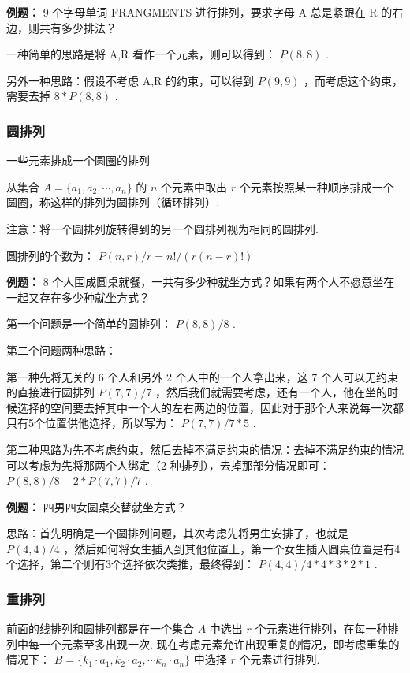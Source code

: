 \documentclass[cn, hazy, blue, normal, 12pt]{elegantnote}
\begin{document}
\textbf{例题：} 9 个字母单词 FRANGMENTS 进行排列，要求字母 A 总是紧跟在 R 的右边，则共有多少排法？

一种简单的思路是将 A,R 看作一个元素，则可以得到： $ P(8,8) $ .

另外一种思路：假设不考虑 A,R 的约束，可以得到 $ P(9,9) $ ，而考虑这个约束， 需要去掉 $ 8*P(8,8) $ .

\subsubsection{圆排列}

一些元素排成一个圆圈的排列

从集合 $ A=\{a_1,a_2,\cdots,a_n\} $ 的 $ n $ 个元素中取出 $ r $ 个元素按照某一种顺序排成一个圆圈，称这样的排列为圆排列（循环排列）.

注意：将一个圆排列旋转得到的另一个圆排列视为相同的圆排列.

圆排列的个数为： $ P(n,r)/r=n!/(r(n-r)!) $

\textbf{例题：} 8 个人围成圆桌就餐，一共有多少种就坐方式？如果有两个人不愿意坐在一起又存在多少种就坐方式？

第一个问题是一个简单的圆排列： $ P(8,8)/8 $ .

第二个问题两种思路：

第一种先将无关的 6 个人和另外 2 个人中的一个人拿出来，这 7 个人可以无约束的直接进行圆排列 $ P(7,7)/7 $ ，然后我们就需要考虑，还有一个人，他在坐的时候选择的空间要去掉其中一个人的左右两边的位置，因此对于那个人来说每一次都只有5个位置供他选择，所以写为： $ P(7,7)/7 *5 $ .

第二种思路为先不考虑约束，然后去掉不满足约束的情况：去掉不满足约束的情况可以考虑为先将那两个人绑定（2 种排列），去掉那部分情况即可： $ P(8,8)/8 - 2*P(7,7)/7 $ .

\textbf{例题：} 四男四女圆桌交替就坐方式？

思路：首先明确是一个圆排列问题，其次考虑先将男生安排了，也就是 $ P(4,4)/4 $ ，然后如何将女生插入到其他位置上，第一个女生插入圆桌位置是有4个选择，第二个则有3个选择依次类推，最终得到： $ P(4,4)/4 *4*3*2*1 $ .

\subsubsection{重排列}

前面的线排列和圆排列都是在一个集合 $ A $ 中选出 $ r $ 个元素进行排列，在每一种排列中每一个元素至多出现一次. 现在考虑元素允许出现重复的情况，即考虑重集的情况下： $ B=\{k_1\cdot a_1,k_2\cdot a_2,\cdots k_n\cdot a_n\} $ 中选择 $ r $ 个元素进行排列.
\end{document}
